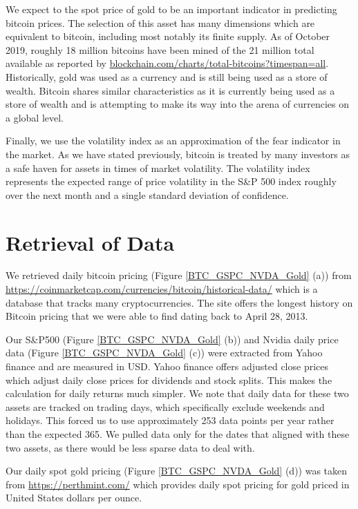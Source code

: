 \documentclass[9pt,twocolumn,twoside]{ilcss}
\begin{document}
We expect to the spot price of gold to be an important indicator in predicting bitcoin prices. The selection of this asset has many dimensions which are equivalent to bitcoin, including most notably its finite supply. As of October 2019, roughly 18 million bitcoins have been mined of the 21 million total available as reported by \url{blockchain.com/charts/total-bitcoins?timespan=all}. Historically, gold was used as a currency and is still being used as a store of wealth. Bitcoin shares similar characteristics as it is currently being used as a store of wealth and is attempting to make its way into the arena of currencies on a global level.

Finally, we use the volatility index as an approximation of the fear indicator in the market. As we have stated previously, bitcoin is treated by many investors as a safe haven for assets in times of market volatility. The volatility index represents the expected range of price volatility in the S\&P 500 index roughly over the next month and a single standard deviation of confidence.  

\section{Retrieval of Data}
We retrieved daily bitcoin pricing (Figure \ref{BTC_GSPC_NVDA_Gold} (a)) from \url{https://coinmarketcap.com/currencies/bitcoin/historical-data/} which is a database that tracks many cryptocurrencies. The site offers the longest history on Bitcoin pricing that we were able to find dating back to April 28, 2013.

Our S\&P500 (Figure \ref{BTC_GSPC_NVDA_Gold} (b)) and Nvidia daily price data (Figure \ref{BTC_GSPC_NVDA_Gold} (c)) were extracted from Yahoo finance and are measured in USD. Yahoo finance offers adjusted close prices which adjust daily close prices for dividends and stock splits. This makes the calculation for daily returns much simpler. We note that daily data for these two assets are tracked on trading days, which specifically exclude weekends and holidays. This forced us to use approximately 253 data points per year rather than the expected 365. We pulled data only for the dates that aligned with these two assets, as there would be less sparse data to deal with. 

Our daily spot gold pricing (Figure \ref{BTC_GSPC_NVDA_Gold} (d)) was taken from \url{https://perthmint.com/} which provides daily spot pricing for gold priced in United States dollars per ounce. 
\end{document}
